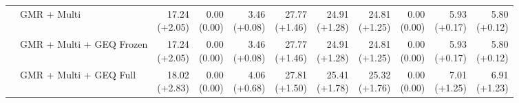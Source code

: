 \documentclass{article}
\begin{document}
{\begin{tabular}{llrrrrrrrrr}
 & GMR + Multi & \shortstack{17.24 \\ {\scriptsize\textcolor{Gain}{(+2.05)}}} & \shortstack{0.00 \\ {\scriptsize\textcolor{Zero}{(0.00)}}} & \shortstack{3.46 \\ {\scriptsize\textcolor{Gain}{(+0.08)}}} & \shortstack{27.77 \\ {\scriptsize\textcolor{Gain}{(+1.46)}}} & \shortstack{24.91 \\ {\scriptsize\textcolor{Gain}{(+1.28)}}} & \shortstack{24.81 \\ {\scriptsize\textcolor{Gain}{(+1.25)}}} & \shortstack{0.00 \\ {\scriptsize\textcolor{Zero}{(0.00)}}} & \shortstack{5.93 \\ {\scriptsize\textcolor{Gain}{(+0.17)}}} & \shortstack{5.80 \\ {\scriptsize\textcolor{Gain}{(+0.12)}}} \\
 & GMR + Multi + GEQ Frozen & \shortstack{17.24 \\ {\scriptsize\textcolor{Gain}{(+2.05)}}} & \shortstack{0.00 \\ {\scriptsize\textcolor{Zero}{(0.00)}}} & \shortstack{3.46 \\ {\scriptsize\textcolor{Gain}{(+0.08)}}} & \shortstack{27.77 \\ {\scriptsize\textcolor{Gain}{(+1.46)}}} & \shortstack{24.91 \\ {\scriptsize\textcolor{Gain}{(+1.28)}}} & \shortstack{24.81 \\ {\scriptsize\textcolor{Gain}{(+1.25)}}} & \shortstack{0.00 \\ {\scriptsize\textcolor{Zero}{(0.00)}}} & \shortstack{5.93 \\ {\scriptsize\textcolor{Gain}{(+0.17)}}} & \shortstack{5.80 \\ {\scriptsize\textcolor{Gain}{(+0.12)}}} \\
 & GMR + Multi + GEQ Full & \shortstack{18.02 \\ {\scriptsize\textcolor{Gain}{(+2.83)}}} & \shortstack{0.00 \\ {\scriptsize\textcolor{Zero}{(0.00)}}} & \shortstack{4.06 \\ {\scriptsize\textcolor{Gain}{(+0.68)}}} & \shortstack{27.81 \\ {\scriptsize\textcolor{Gain}{(+1.50)}}} & \shortstack{25.41 \\ {\scriptsize\textcolor{Gain}{(+1.78)}}} & \shortstack{25.32 \\ {\scriptsize\textcolor{Gain}{(+1.76)}}} & \shortstack{0.00 \\ {\scriptsize\textcolor{Zero}{(0.00)}}} & \shortstack{7.01 \\ {\scriptsize\textcolor{Gain}{(+1.25)}}} & \shortstack{6.91 \\ {\scriptsize\textcolor{Gain}{(+1.23)}}} \\
\bottomrule\end{tabular}}\par
\end{document}
